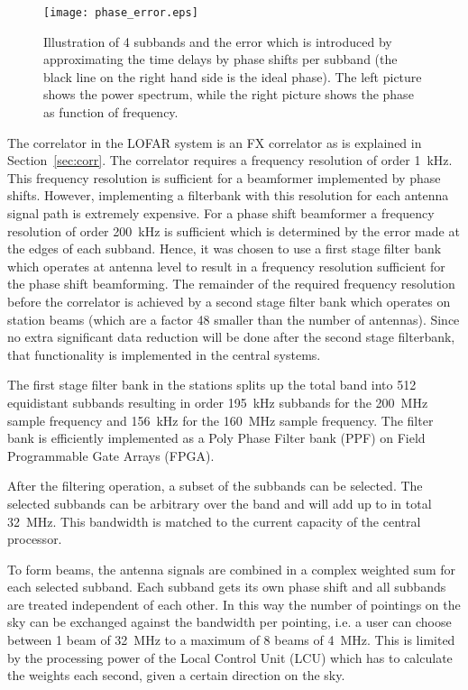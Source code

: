 \documentclass[journal]{IEEEtran}
\begin{document}
\begin{figure}
\begin{center}
\texttt{[image: phase\_error.eps]}
\end{center}
\caption{Illustration of 4 subbands and the error which is introduced by approximating the time delays by phase shifts per subband (the black line on the right hand side is the ideal phase). The left picture shows the power spectrum, while the right picture shows the phase as function of frequency.}
\label{fig:phasebeamf}
\end{figure}

The correlator in the LOFAR system is an FX correlator as is explained in Section~\ref{sec:corr}. The correlator requires a frequency resolution of order 1~kHz. This frequency resolution is sufficient for a beamformer implemented by phase shifts. However, implementing a filterbank with this resolution for each antenna signal path is extremely expensive. For a phase shift beamformer a frequency resolution of order 200~kHz is sufficient which is determined by the error made at the edges of each subband. Hence, it was chosen to use a first stage filter bank which operates at antenna level to result in a frequency resolution sufficient for the phase shift beamforming. The remainder of the required frequency resolution before the correlator is achieved by a second stage filter bank which operates on station beams (which are a factor 48 smaller than the number of antennas). Since no extra significant data reduction will be done after the second stage filterbank, that functionality is implemented in the central systems.

The first stage filter bank in the stations splits up the total band into 512 equidistant subbands resulting in order 195~kHz subbands for the 200~MHz sample frequency and 156~kHz for the 160~MHz sample frequency. The filter bank is efficiently implemented as a Poly Phase Filter bank (PPF) on Field Programmable Gate Arrays (FPGA).

After the filtering operation, a subset of the subbands can be selected. The selected subbands can be arbitrary over the band and will add up to in total 32~MHz. This bandwidth is matched to the current capacity of the central processor.

To form beams, the antenna signals are combined in a complex weighted sum for each selected subband. Each subband gets its own phase shift and all subbands are treated independent of each other. In this way the number of pointings on the sky can be exchanged against the bandwidth per pointing, i.e. a user can choose between 1 beam of 32~MHz to a maximum of 8 beams of 4~MHz. This is limited by the processing power of the Local Control Unit (LCU) which has to calculate the weights each second, given a certain direction on the sky. 
\end{document}
